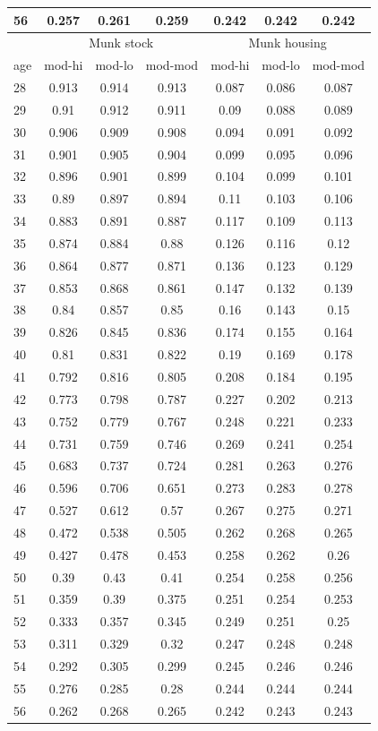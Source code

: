 \documentclass[]{article}
\begin{document}
\begin{appendix}
\begin{longtable}{|l|ccc|ccc|}
56&0.257&0.261&0.259&0.242&0.242&0.242\\
		\hline
		&\multicolumn{3}{c|}{Munk stock}&\multicolumn{3}{c|}{Munk housing}\\
		\hline
		age&mod-hi&mod-lo&mod-mod&mod-hi&mod-lo&mod-mod\\
		\hline
28&0.913&0.914&0.913&0.087&0.086&0.087\\
29&0.91&0.912&0.911&0.09&0.088&0.089\\
30&0.906&0.909&0.908&0.094&0.091&0.092\\
31&0.901&0.905&0.904&0.099&0.095&0.096\\
32&0.896&0.901&0.899&0.104&0.099&0.101\\
33&0.89&0.897&0.894&0.11&0.103&0.106\\
34&0.883&0.891&0.887&0.117&0.109&0.113\\
35&0.874&0.884&0.88&0.126&0.116&0.12\\
36&0.864&0.877&0.871&0.136&0.123&0.129\\
37&0.853&0.868&0.861&0.147&0.132&0.139\\
38&0.84&0.857&0.85&0.16&0.143&0.15\\
39&0.826&0.845&0.836&0.174&0.155&0.164\\
40&0.81&0.831&0.822&0.19&0.169&0.178\\
41&0.792&0.816&0.805&0.208&0.184&0.195\\
42&0.773&0.798&0.787&0.227&0.202&0.213\\
43&0.752&0.779&0.767&0.248&0.221&0.233\\
44&0.731&0.759&0.746&0.269&0.241&0.254\\
45&0.683&0.737&0.724&0.281&0.263&0.276\\
46&0.596&0.706&0.651&0.273&0.283&0.278\\
47&0.527&0.612&0.57&0.267&0.275&0.271\\
48&0.472&0.538&0.505&0.262&0.268&0.265\\
49&0.427&0.478&0.453&0.258&0.262&0.26\\
50&0.39&0.43&0.41&0.254&0.258&0.256\\
51&0.359&0.39&0.375&0.251&0.254&0.253\\
52&0.333&0.357&0.345&0.249&0.251&0.25\\
53&0.311&0.329&0.32&0.247&0.248&0.248\\
54&0.292&0.305&0.299&0.245&0.246&0.246\\
55&0.276&0.285&0.28&0.244&0.244&0.244\\
56&0.262&0.268&0.265&0.242&0.243&0.243\\

\end{longtable}
\end{appendix}
\end{document}
